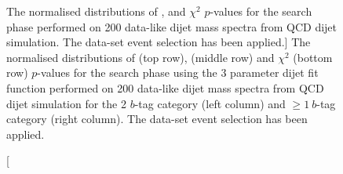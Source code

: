 \begin{figure}[!thb]
\begin{center}
  \end{center}
  \vspace{-1em}
  \caption
      [The normalised distributions of \bh{}, \dhunt{} and $\chi^{2}$  \mbox{$p$-value}s for
        the search phase performed on 200 data-like dijet mass spectra from QCD dijet simulation.
        The \summer{} data-set event selection has been applied.]
      {The normalised distributions of \bh{} (top row),  \dhunt{} (middle row) and $\chi^{2}$ (bottom row) \mbox{$p$-value}s for
        the search phase using the 3 parameter dijet fit function performed on
        200 data-like dijet mass spectra from QCD dijet simulation
        for the 2 $b$-tag category (left column) and $\geq1~b$-tag category (right column).
        The \summer{} data-set event selection has been applied.
        \label{fig:pValueHists}}

\end{figure}



